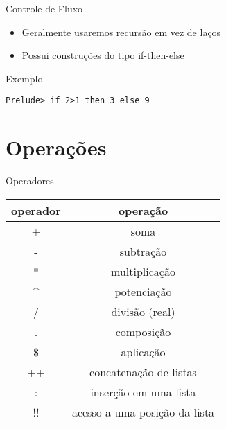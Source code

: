 \documentclass{beamer}
\begin{document}
	\begin{frame}[fragile]{Controle de Fluxo}
		\begin{itemize}
		 \item Geralmente usaremos recursão em vez de laços
		 \item Possui construções do tipo if-then-else
		\end{itemize}
		
		\begin{block}{Exemplo}
		 \begin{lstlisting}
Prelude> if 2>1 then 3 else 9
		 \end{lstlisting}
		\end{block}
	\end{frame}
	
	\section{Operações}
	
	\begin{frame}{}
	\end{frame}
	
	\begin{frame}{Operadores}
	 \begin{table}[h]
	  \centering
	  \begin{tabular}{c | c}
			\hline
			operador & operação\\
			\hline
			+ & soma \\
			- & subtração \\
			* & multiplicação\\
			\textasciicircum & potenciação\\
			/ & divisão (real)\\
			. & composição \\
			\$ & aplicação \\
			++ & concatenação de listas\\
			: & inserção em uma lista\\
			!! & acesso a uma posição da lista\\			
			\hline
	  \end{tabular}
	 \end{table}	 
	\end{frame}
	
\end{document}
